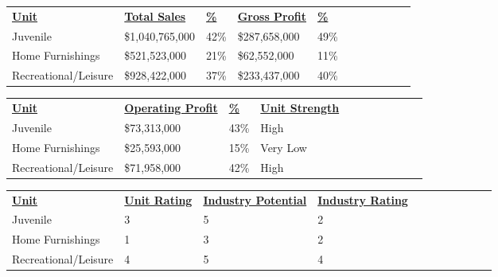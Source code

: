 \begin{table}[h]
    \begin{tabular}{lllllllllll}
    {\bf \underline{Unit}}                 & {\bf \underline{Total Sales}}    & {\bf \underline{\%}}  & {\bf \underline{Gross Profit}} & {\bf \underline{\%}}\\
    Juvenile             & \$1,040,765,000 & 42\% & \$287,658,000 & 49\% \\
    Home Furnishings     & \$521,523,000  & 21\% & \$62,552,000 & 11\% \\
    Recreational/Leisure & \$928,422,000  & 37\% & \$233,437,000 & 40\% \\
    \end{tabular}
\end{table}

\begin{table}[h]
    \begin{tabular}{lllllllllll}
    {\bf \underline{Unit}}             &  {\bf \underline{Operating Profit}} & {\bf \underline{\%}}  & {\bf \underline{Unit Strength}} \\
    Juvenile             & \$73,313,000     & 43\% & High \\
    Home Furnishings     & \$25,593,000     & 15\% & Very Low \\
    Recreational/Leisure  & \$71,958,000     & 42\% & High \\
    \end{tabular}
\end{table}

\begin{table}[h]
    \begin{tabular}{lllllllllll}
    {\bf \underline{Unit}}               &{\bf \underline{Unit Rating}} &  {\bf \underline{Industry Potential}} &{\bf \underline{Industry Rating}} \\
    Juvenile             & 3           & 5                  & 2               \\
    Home Furnishings      & 1           & 3                  & 2               \\
    Recreational/Leisure  & 4           & 5                  & 4               \\
    \end{tabular}
\end{table}
